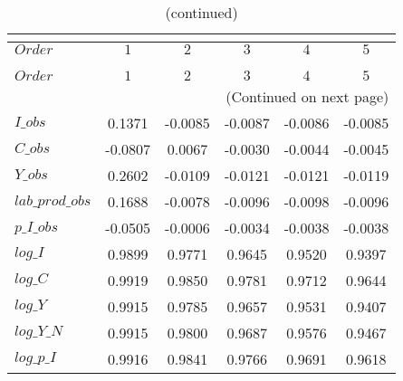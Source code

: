  
\begin{center}
\begin{longtable}{lccccc} 
\caption{COEFFICIENTS OF AUTOCORRELATION}\\
 \label{Table:th_autocorr_matrix}\\
\toprule 
$Order           $	 & 	 $          1$	 & 	 $          2$	 & 	 $          3$	 & 	 $          4$	 & 	 $          5$\\
\midrule \endfirsthead 
\caption{(continued)}\\
 \toprule \\ 
$Order           $	 & 	 $          1$	 & 	 $          2$	 & 	 $          3$	 & 	 $          4$	 & 	 $          5$\\
\midrule \endhead 
\midrule \multicolumn{6}{r}{(Continued on next page)} \\ \bottomrule \endfoot 
\bottomrule \endlastfoot 
$I\_obs          $	 & 	     0.1371	 & 	    -0.0085	 & 	    -0.0087	 & 	    -0.0086	 & 	    -0.0085 \\ 
$C\_obs          $	 & 	    -0.0807	 & 	     0.0067	 & 	    -0.0030	 & 	    -0.0044	 & 	    -0.0045 \\ 
$Y\_obs          $	 & 	     0.2602	 & 	    -0.0109	 & 	    -0.0121	 & 	    -0.0121	 & 	    -0.0119 \\ 
$lab\_prod\_obs  $	 & 	     0.1688	 & 	    -0.0078	 & 	    -0.0096	 & 	    -0.0098	 & 	    -0.0096 \\ 
$p\_I\_obs       $	 & 	    -0.0505	 & 	    -0.0006	 & 	    -0.0034	 & 	    -0.0038	 & 	    -0.0038 \\ 
$log\_I          $	 & 	     0.9899	 & 	     0.9771	 & 	     0.9645	 & 	     0.9520	 & 	     0.9397 \\ 
$log\_C          $	 & 	     0.9919	 & 	     0.9850	 & 	     0.9781	 & 	     0.9712	 & 	     0.9644 \\ 
$log\_Y          $	 & 	     0.9915	 & 	     0.9785	 & 	     0.9657	 & 	     0.9531	 & 	     0.9407 \\ 
$log\_Y\_N       $	 & 	     0.9915	 & 	     0.9800	 & 	     0.9687	 & 	     0.9576	 & 	     0.9467 \\ 
$log\_p\_I       $	 & 	     0.9916	 & 	     0.9841	 & 	     0.9766	 & 	     0.9691	 & 	     0.9618 \\ 
\end{longtable}
 \end{center}
